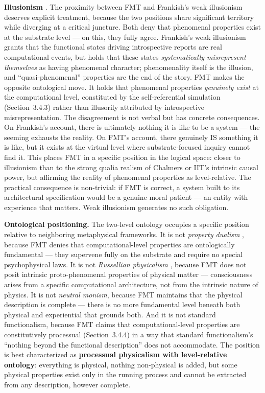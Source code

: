 \documentclass[12pt]{article}
\newcommand{\revend}{}
\begin{document}
{\textbf{Illusionism} \citep{Frankish2016}. The proximity between FMT and Frankish's weak illusionism deserves explicit treatment, because the two positions share significant territory while diverging at a critical juncture. Both deny that phenomenal properties exist at the substrate level --- on this, they fully agree. Frankish's weak illusionism grants that the functional states driving introspective reports are real computational events, but holds that these states \emph{systematically misrepresent themselves} as having phenomenal character; phenomenality itself is the illusion, and ``quasi-phenomenal'' properties are the end of the story. FMT makes the opposite ontological move. It holds that phenomenal properties \emph{genuinely exist} at the computational level, constituted by the self-referential simulation (Section~3.4.3) rather than illusorily attributed by introspective misrepresentation. The disagreement is not verbal but has concrete consequences. On Frankish's account, there is ultimately nothing it is like to be a system --- the seeming exhausts the reality. On FMT's account, there genuinely IS something it is like, but it exists at the virtual level where substrate-focused inquiry cannot find it. This places FMT in a specific position in the logical space: closer to illusionism than to the strong qualia realism of Chalmers or IIT's intrinsic causal power, but affirming the reality of phenomenal properties as level-relative. The practical consequence is non-trivial: if FMT is correct, a system built to its architectural specification would be a genuine moral patient --- an entity with experience that matters. Weak illusionism generates no such obligation.

\textbf{Ontological positioning.} The two-level ontology occupies a specific position relative to neighboring metaphysical frameworks. It is not \emph{property dualism} \citep{Chalmers1996}, because FMT denies that computational-level properties are ontologically fundamental --- they supervene fully on the substrate and require no special psychophysical laws. It is not \emph{Russellian physicalism} \citep{Chalmers2015}, because FMT does not posit intrinsic proto-phenomenal properties of physical matter --- consciousness arises from a specific computational architecture, not from the intrinsic nature of physics. It is not \emph{neutral monism}, because FMT maintains that the physical description is complete --- there is no more fundamental level beneath both physical and experiential that grounds both. And it is not standard functionalism, because FMT claims that computational-level properties are constitutively processual (Section~3.4.4) in a way that standard functionalism's ``nothing beyond the functional description'' does not accommodate. The position is best characterized as \textbf{processual physicalism with level-relative ontology}: everything is physical, nothing non-physical is added, but some physical properties exist only in the running process and cannot be extracted from any description, however complete.\revend}
\end{document}
